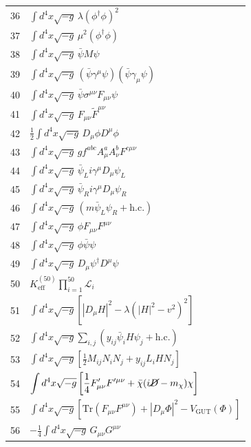 \documentclass[12pt,a4paper]{article}
\begin{document}
\begin{longtable}{r p{}}
	36 & \(\displaystyle \int d^4x\sqrt{-g}\,\lambda(\phi^\dagger\phi)^2\) \\
	37 & \(\displaystyle \int d^4x\sqrt{-g}\,\mu^2(\phi^\dagger\phi)\) \\
	38 & \(\displaystyle \int d^4x\sqrt{-g}\,\bar\psi M\psi\) \\
	39 & \(\displaystyle \int d^4x\sqrt{-g}\,(\bar\psi\gamma^\mu\psi)(\bar\psi\gamma_\mu\psi)\) \\
	40 & \(\displaystyle \int d^4x\sqrt{-g}\,\bar\psi\sigma^{\mu\nu}F_{\mu\nu}\psi\) \\
	41 & \(\displaystyle \int d^4x\sqrt{-g}\,F_{\mu\nu}\tilde{F}^{\mu\nu}\) \\
	42 & \(\displaystyle \frac12\int d^4x\sqrt{-g}\,D_\mu\phi D^\mu\phi\) \\
	43 & \(\displaystyle \int d^4x\sqrt{-g}\,g f^{abc}A^a_\mu A^b_\nu F^{c\mu\nu}\) \\
	44 & \(\displaystyle \int d^4x\sqrt{-g}\,\bar\psi_L i\gamma^\mu D_\mu\psi_L\) \\
	45 & \(\displaystyle \int d^4x\sqrt{-g}\,\bar\psi_R i\gamma^\mu D_\mu\psi_R\) \\
	46 & \(\displaystyle \int d^4x\sqrt{-g}\,(m\bar\psi_L\psi_R + \text{h.c.})\) \\
	47 & \(\displaystyle \int d^4x\sqrt{-g}\,\phi F_{\mu\nu}F^{\mu\nu}\) \\
	48 & \(\displaystyle \int d^4x\sqrt{-g}\,\phi\bar\psi\psi\) \\
	49 & \(\displaystyle \int d^4x\sqrt{-g}\,D_\mu\psi^\dagger D^\mu\psi\) \\
	50 & \(\displaystyle K^{(50)}_{\mathrm{eff}}\prod_{i=1}^{50}\mathcal{L}_i\) \\
	51 & \(\displaystyle \int d^4x\sqrt{-g}\left[|D_\mu H|^2 - \lambda(|H|^2 - v^2)^2\right]\) \\
	52 & \(\displaystyle \int d^4x\sqrt{-g}\sum_{i,j}\left(y_{ij}\bar\psi_i H\psi_j + \text{h.c.}\right)\) \\
	53 & \(\displaystyle \int d^4x\sqrt{-g}\left[\frac12 M_{ij}N_i N_j + y_{ij}L_i H N_j\right]\) \\
	54 & \(\displaystyle \int d^4x\sqrt{-g}\left[\frac14 F'_{\mu\nu}F'^{\mu\nu} + \bar\chi(i\cancel{D} - m_\chi)\chi\right]\) \\
	55 & \(\displaystyle \int d^4x\sqrt{-g}\left[\mathrm{Tr}(F_{\mu\nu}F^{\mu\nu}) + |D_\mu\Phi|^2 - V_{\text{GUT}}(\Phi)\right]\) \\
	56 & \(\displaystyle -\frac14\int d^4x\sqrt{-g}\,G_{\mu\nu}G^{\mu\nu}\) \\

\end{longtable}
\end{document}

